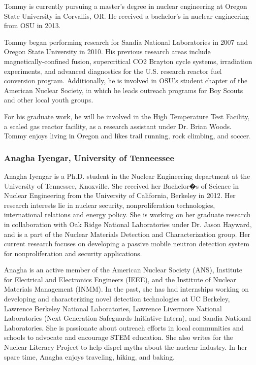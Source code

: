 Tommy is currently pursuing a master's degree in nuclear engineering at Oregon
State University in Corvallis, OR. He received a bachelor's in nuclear
engineering from OSU in 2013.

Tommy began performing research for Sandia National Laboratories in 2007 and
Oregon State University in 2010. His previous research areas include
magnetically-confined fusion, supercritical CO2 Brayton cycle systems,
irradiation experiments, and advanced diagnostics for the U.S. research reactor
fuel conversion program. Additionally, he is involved in OSU's student chapter
of the American Nuclear Society, in which he leads outreach programs for Boy
Scouts and other local youth groups.

For his graduate work, he will be involved in the High Temperature Test
Facility, a scaled gas reactor facility, as a research assistant under Dr. Brian
Woods. Tommy enjoys living in Oregon and likes trail running, rock climbing, and
soccer.

\subsubsection*{Anagha Iyengar, University of Tenneessee}

Anagha Iyengar is a Ph.D. student in the Nuclear Engineering department at the
University of Tennessee, Knoxville. She received her Bachelor�s of Science in
Nuclear Engineering from the University of California, Berkeley in 2012. Her
research interests lie in nuclear security, nonproliferation technologies,
international relations and energy policy. She is working on her graduate
research in collaboration with Oak Ridge National Laboratories under Dr. Jason
Hayward, and is a part of the Nuclear Materials Detection and Characterization
group. Her current research focuses on developing a passive mobile neutron
detection system for nonproliferation and security applications.

Anagha is an active member of the American Nuclear Society (ANS), Institute for
Electrical and Electronics Engineers (IEEE), and the Institute of Nuclear
Materials Management (INMM). In the past, she has had internships working on
developing and characterizing novel detection technologies at UC Berkeley,
Lawrence Berkeley National Laboratories, Lawrence Livermore National
Laboratories (Next Generation Safeguards Initiative Intern), and Sandia National
Laboratories. She is passionate about outreach efforts in local communities and
schools to advocate and encourage STEM education. She also writes for the
Nuclear Literacy Project to help dispel myths about the nuclear industry. In her
spare time, Anagha enjoys traveling, hiking, and baking.

